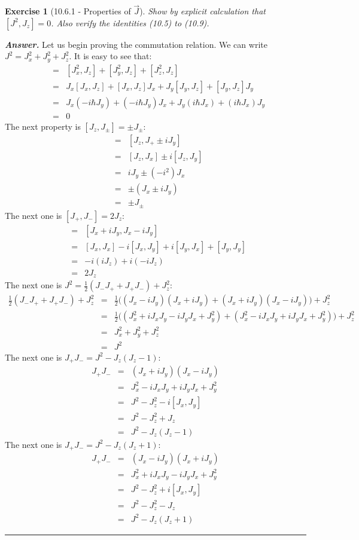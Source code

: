 \documentclass[12pt]{article}
\def\bea{\begin{eqnarray*}}
\def\eea{\end{eqnarray*}}
\def\f{\frac}
\newtheorem{exercise}{Exercise}
\newenvironment{answer}{\noindent\textbf{\textit{Answer.}} \normalfont }{\par\noindent\rule{\textwidth}{0.4pt}}
\begin{document}
	
	\begin{exercise}[10.6.1 - Properties of $\vec{J}$]
		Show by explicit calculation that $[J^2, J_z]=0$. Also verify the identities (10.5) to (10.9).		
	\end{exercise}
	\begin{answer}
		Let us begin proving the commutation relation. We can write $J^2 = J_x^2 + J_y^2 + J_z^2$. It is easy to see that:
		\bea
			[J^2, J_z] &=& [J_x^2, J_z] + [J_y^2, J_z] + [J_z^2, J_z] \\
			&=& J_x[J_x, J_z] + [J_x, J_z]J_x + J_y[J_y, J_z] + [J_y, J_z]J_y \\
			&=& J_x (-i\hbar J_y) + (-i\hbar J_y)J_x + J_y(i\hbar J_x) + (i\hbar J_x)J_y \\
			&=& 0
		\eea
		The next property is $[J_z, J_\pm]=\pm J_\pm$:
		\bea
			[J_z, J_\pm] &=& [J_z, J_+ \pm iJ_y] \\
				&=& [J_z, J_x] \pm i [J_z, J_y] \\
				&=& iJ_y \pm (-i^2)J_x \\
				&=& \pm (J_x \pm i J_y) \\
				&=& \pm J_\pm
		\eea
		The next one is $[J_+, J_-]=2J_z$:
		\bea
			[J_+, J_-] &=& [J_x + iJ_y, J_x - iJ_y] \\
				&=& [J_x, J_x] -i[J_x, J_y] + i[J_y, J_x] + [J_y, J_y] \\
				&=& -i (iJ_z) + i (-iJ_z) \\
				&=& 2J_z
		\eea
		The next one is $J^2 = \f{1}{2}(J_-J_+ + J_+J_-) + J_z^2$:
		\bea
			\f{1}{2}(J_-J_+ + J_+J_-) + J_z^2 &=& \f{1}{2}\Big( (J_x-iJ_y)(J_x+iJ_y) + (J_x+iJ_y)(J_x-iJ_y) \Big) + J_z^2 \\
				&=& \f{1}{2}\Big( (J_x^2 + iJ_xJ_y -iJ_yJ_x + J_y^2) + (J_x^2 -iJ_xJ_y + iJ_yJ_x + J_y^2) \Big) + J_z^2 \\
				&=& J_x^2 + J_y^2 + J_z^2 \\
				&=& J^2
		\eea
		The next one is $J_+J_- = J^2 - J_z(J_z-1)$: 
		\bea
			J_+J_- &=& (J_x+iJ_y)(J_x-iJ_y) \\
				&=& J_x^2 -iJ_xJ_y + iJ_yJ_x + J_y^2 \\
				&=& J^2 - J_z^2 -i[J_x, J_y] \\
				&=& J^2 - J_z^2 + J_z \\
				&=& J^2 -J_z(J_z-1)
		\eea
		The next one is $J_+J_- = J^2 - J_z(J_z+1)$: 
		\bea
			J_+J_- &=& (J_x-iJ_y)(J_x+iJ_y) \\
			&=& J_x^2 +iJ_xJ_y - iJ_yJ_x + J_y^2 \\
			&=& J^2 - J_z^2 +i[J_x, J_y] \\
			&=& J^2 - J_z^2 - J_z \\
			&=& J^2 -J_z(J_z+1)
		\eea
	\end{answer}
	
\end{document}
